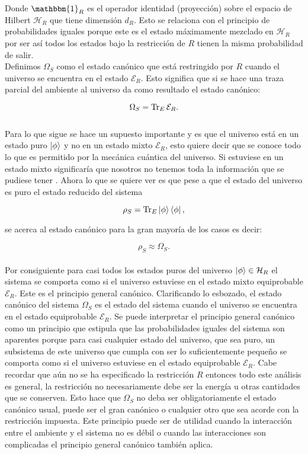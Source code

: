 Donde $\mathbbm{1}_{R}$ es el operador identidad (proyección) sobre el espacio de Hilbert  $\mathcal{H}_{R}$  que tiene dimensión $d_{R}$. Esto se relaciona con el principio de probabilidades iguales porque este es el estado máximamente mezclado en $\mathcal{H}_{R}$  \cite{SakuraiQuantum} por ser así todos los estados bajo la restricción de $R$ tienen la misma probabilidad de salir.
\\
Definimos $\Omega_{S}$ como el estado canónico que está restringido por $R$ cuando el universo se encuentra en el estado $\mathcal{E}_{R}$. Esto significa que si se hace una traza parcial del ambiente al universo da como resultado el estado canónico:

\begin{equation}
 \Omega_{S} =\Tr_{E} \mathcal{E}_{R}.
\end{equation}
\\
Para lo que sigue se hace un supuesto importante  y es que el universo está en un estado puro $\ket{\phi}$ y no en un estado mixto $\mathcal{E}_{R}$, esto quiere decir que se conoce todo lo que es permitido por la mecánica cuántica del universo. Si estuviese en un estado mixto significaría que nosotros no tenemos toda la información que se pudiese tener \cite{SakuraiQuantum}. Ahora lo que se quiere ver es que  pese a que el estado del universo es puro el estado reducido del sistema

\begin{equation}
\rho_{S}=\Tr_{E}\ket{\phi}\bra{\phi},
\end{equation}

se acerca al estado canónico para la gran mayoría de los casos es decir:

\begin{equation}
\rho_{S} \approx \Omega_{S}.
\end{equation}
\\
Por consiguiente para casi todos los estados puros del universo $\ket{\phi} \in \mathcal{H}_{R}$ el sistema se comporta como si el universo estuviese en el estado mixto equiprobable $\mathcal{E}_{R}$. Este  es el principio general canónico. Clarificando lo esbozado, el estado canónico del sistema $\Omega_{S}$ es el estado del sistema cuando el universo se encuentra en el estado equiprobable $\mathcal{E}_{R}$. Se puede interpretar el principio general canónico como un principio que estipula que las probabilidades iguales del sistema son aparentes porque para casi cualquier estado del universo, que sea puro, un subsistema de este universo que cumpla con ser lo suficientemente pequeño se comporta como si el universo estuviese en el estado equiprobable $\mathcal{E}_{R}$. Cabe recordar que aún no se ha especificado la restricción $R$ entonces todo este análisis es general, la restricción no necesariamente debe ser la energía u otras cantidades que se conserven. Esto hace que $\Omega_{S}$ no  deba ser obligatoriamente el estado canónico usual, puede ser el gran canónico o cualquier otro que sea acorde con la restricción impuesta\cite{ReichlStat}. Este principio puede ser de utilidad cuando la interacción entre el ambiente y el sistema no es débil o cuando las interacciones son complicadas el principio general canónico también aplica.

